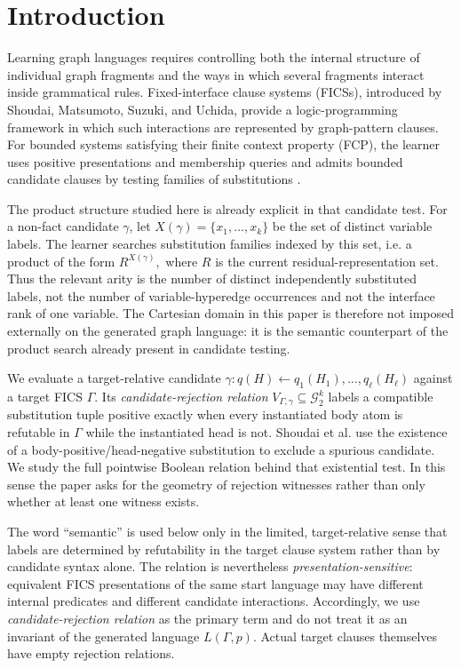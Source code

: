 \documentclass[11pt]{article}
\theoremstyle{definition}
\theoremstyle{remark}
\begin{document}
\section{Introduction}

Learning graph languages requires controlling both the internal structure of
individual graph fragments and the ways in which several fragments interact
inside grammatical rules. Fixed-interface clause systems (FICSs), introduced
by Shoudai, Matsumoto, Suzuki, and Uchida, provide a logic-programming
framework in which such interactions are represented by graph-pattern clauses.
For bounded systems satisfying their finite context property (FCP), the
learner uses positive presentations and membership queries and admits bounded
candidate clauses by testing families of substitutions
\cite{ShoudaiEtAl2026}.

The product structure studied here is already explicit in that candidate test.
For a non-fact candidate \(\gamma\), let
\(X(\gamma)=\{x_1,\ldots,x_k\}\)
be the set of distinct variable labels.  The learner searches substitution
families indexed by this set, i.e. a product of the form
\(R^{X(\gamma)},\)
where \(R\) is the current residual-representation set.  Thus the relevant
arity is the number of distinct independently substituted labels, not the
number of variable-hyperedge occurrences and not the interface rank of one
variable.  The Cartesian domain in this paper is therefore not imposed
externally on the generated graph language: it is the semantic counterpart of
the product search already present in candidate testing.

We evaluate a target-relative candidate
\(\gamma:q(H)\leftarrow q_1(H_1),\ldots,q_\ell(H_\ell)\)
against a target FICS \(\Gamma\).  Its \emph{candidate-rejection relation}
\(V_{\Gamma,\gamma}\subseteq\mathcal G_2^k\)
labels a compatible substitution tuple positive exactly when every
instantiated body atom is refutable in \(\Gamma\) while the instantiated head
is not.  Shoudai et al. use the existence of a body-positive/head-negative
substitution to exclude a spurious candidate.  We study the full pointwise
Boolean relation behind that existential test.  In this sense the paper asks
for the geometry of rejection witnesses rather than only whether at least one
witness exists.

The word ``semantic'' is used below only in the limited, target-relative sense
that labels are determined by refutability in the target clause system rather
than by candidate syntax alone.  The relation is nevertheless
\emph{presentation-sensitive}: equivalent FICS presentations of the same start
language may have different internal predicates and different candidate
interactions.  Accordingly, we use \emph{candidate-rejection relation} as the
primary term and do not treat it as an invariant of the generated language
\(L(\Gamma,p)\).  Actual target clauses themselves have empty rejection
relations.
\end{document}
